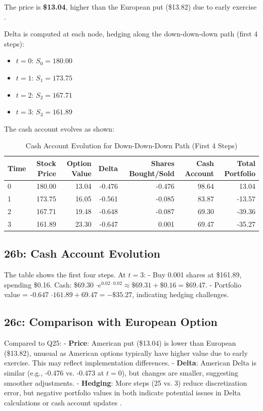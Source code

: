\documentclass{article}
\begin{document}
The price is \textbf{\$13.04}, higher than the European put (\$13.82) due to early exercise \citep{hull2018options}.

Delta is computed at each node, hedging along the down-down-down path (first 4 steps):

\begin{itemize}
    \item $t=0$: $S_0 = 180.00$
    \item $t=1$: $S_1 = 173.75$
    \item $t=2$: $S_2 = 167.71$
    \item $t=3$: $S_3 = 161.89$
\end{itemize}

The cash account evolves as shown:

\begin{table}[h]
\centering
\caption{Cash Account Evolution for Down-Down-Down Path (First 4 Steps)}
\begin{tabular}{lrrrrrr}
\toprule
Time & Stock Price & Option Value & Delta & Shares Bought/Sold & Cash Account & Total Portfolio \\
\midrule
0 & 180.00 & 13.04 & -0.476 & -0.476 & 98.64 & 13.04 \\
1 & 173.75 & 16.05 & -0.561 & -0.085 & 83.87 & -13.57 \\
2 & 167.71 & 19.48 & -0.648 & -0.087 & 69.30 & -39.36 \\
3 & 161.89 & 23.30 & -0.647 & 0.001 & 69.47 & -35.27 \\
\bottomrule
\end{tabular}
\end{table}

\subsection*{26b: Cash Account Evolution}

The table shows the first four steps. At $t=3$:
- Buy 0.001 shares at \$161.89, spending \$0.16. Cash: \$69.30 $\cdot e^{0.02 \cdot 0.02} \approx \$69.31 + \$0.16 = \$69.47$.
- Portfolio value = -0.647 $\cdot 161.89 + 69.47 = -\$35.27$, indicating hedging challenges.

\subsection*{26c: Comparison with European Option}

Compared to Q25:
- \textbf{Price}: American put (\$13.04) is lower than European (\$13.82), unusual as American options typically have higher value due to early exercise. This may reflect implementation differences.
- \textbf{Delta}: American Delta is similar (e.g., -0.476 vs. -0.473 at $t=0$), but changes are smaller, suggesting smoother adjustments.
- \textbf{Hedging}: More steps (25 vs. 3) reduce discretization error, but negative portfolio values in both indicate potential issues in Delta calculations or cash account updates \citep{shreve2004stochastic}.
\end{document}
